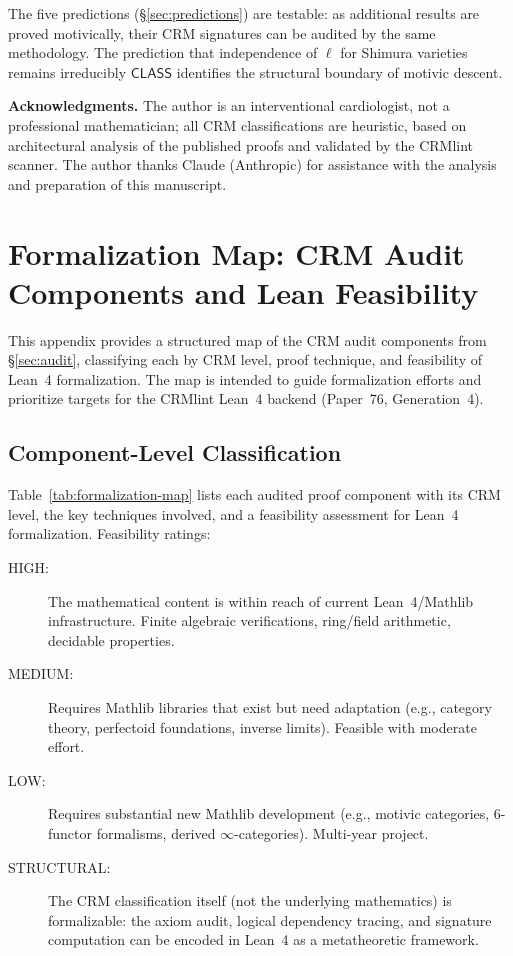 \documentclass[11pt,a4paper]{article}
\theoremstyle{plain}
\theoremstyle{definition}
\newcommand{\CLASS}{\textsf{CLASS}}
\begin{document}
The five predictions (\S\ref{sec:predictions}) are testable: as additional results are proved motivically, their CRM signatures can be audited by the same methodology. The prediction that independence of $\ell$ for Shimura varieties remains irreducibly $\CLASS$ identifies the structural boundary of motivic descent.

\bigskip
\noindent\textbf{Acknowledgments.} The author is an interventional cardiologist, not a professional mathematician; all CRM classifications are heuristic, based on architectural analysis of the published proofs and validated by the CRMlint scanner. The author thanks Claude (Anthropic) for assistance with the analysis and preparation of this manuscript.


\appendix
\section{Formalization Map: CRM Audit Components and Lean Feasibility}\label{app:formalization}

This appendix provides a structured map of the CRM audit components from \S\ref{sec:audit}, classifying each by CRM level, proof technique, and feasibility of Lean~4 formalization. The map is intended to guide formalization efforts and prioritize targets for the CRMlint Lean~4 backend (Paper~76, Generation~4).

\subsection{Component-Level Classification}

Table~\ref{tab:formalization-map} lists each audited proof component with its CRM level, the key techniques involved, and a feasibility assessment for Lean~4 formalization. Feasibility ratings:
\begin{description}
\item[\textsf{HIGH}:] The mathematical content is within reach of current Lean~4/Mathlib infrastructure. Finite algebraic verifications, ring/field arithmetic, decidable properties.
\item[\textsf{MEDIUM}:] Requires Mathlib libraries that exist but need adaptation (e.g., category theory, perfectoid foundations, inverse limits). Feasible with moderate effort.
\item[\textsf{LOW}:] Requires substantial new Mathlib development (e.g., motivic categories, 6-functor formalisms, derived $\infty$-categories). Multi-year project.
\item[\textsf{STRUCTURAL}:] The CRM classification itself (not the underlying mathematics) is formalizable: the axiom audit, logical dependency tracing, and signature computation can be encoded in Lean~4 as a metatheoretic framework.
\end{description}
\end{document}
